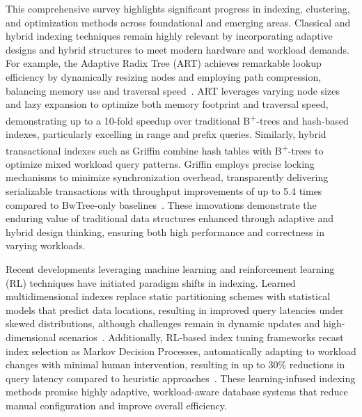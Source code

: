 \documentclass[sigconf]{acmart}
\begin{document}
This comprehensive survey highlights significant progress in indexing, clustering, and optimization methods across foundational and emerging areas. Classical and hybrid indexing techniques remain highly relevant by incorporating adaptive designs and hybrid structures to meet modern hardware and workload demands. For example, the Adaptive Radix Tree (ART) achieves remarkable lookup efficiency by dynamically resizing nodes and employing path compression, balancing memory use and traversal speed~\cite{ref29}. ART leverages varying node sizes and lazy expansion to optimize both memory footprint and traversal speed, demonstrating up to a 10-fold speedup over traditional B\textsuperscript{+}-trees and hash-based indexes, particularly excelling in range and prefix queries. Similarly, hybrid transactional indexes such as Griffin combine hash tables with B\textsuperscript{+}-trees to optimize mixed workload query patterns. Griffin employs precise locking mechanisms to minimize synchronization overhead, transparently delivering serializable transactions with throughput improvements of up to 5.4 times compared to BwTree-only baselines~\cite{ref35}. These innovations demonstrate the enduring value of traditional data structures enhanced through adaptive and hybrid design thinking, ensuring both high performance and correctness in varying workloads.

Recent developments leveraging machine learning and reinforcement learning (RL) techniques have initiated paradigm shifts in indexing. Learned multidimensional indexes replace static partitioning schemes with statistical models that predict data locations, resulting in improved query latencies under skewed distributions, although challenges remain in dynamic updates and high-dimensional scenarios~\cite{ref30}. Additionally, RL-based index tuning frameworks recast index selection as Markov Decision Processes, automatically adapting to workload changes with minimal human intervention, resulting in up to 30\% reductions in query latency compared to heuristic approaches~\cite{ref33}. These learning-infused indexing methods promise highly adaptive, workload-aware database systems that reduce manual configuration and improve overall efficiency.
\end{document}
